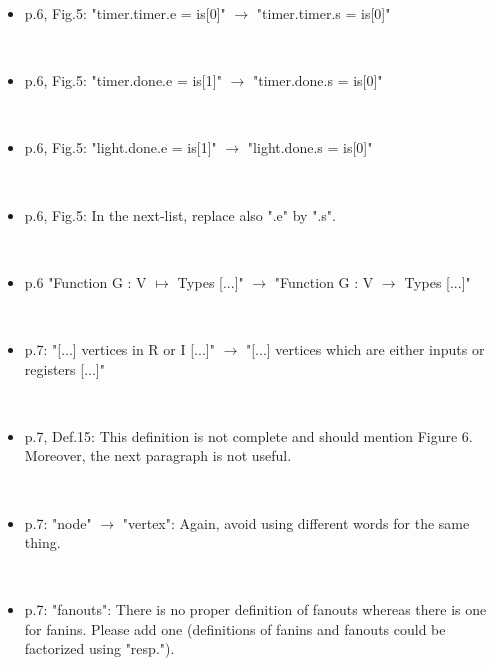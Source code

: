\begin{itemize}
~

\done

\item p.6, Fig.5: "timer.timer.e = is[0]" $\rightarrow$ "timer.timer.s = is[0]"

~

\done

\item p.6, Fig.5: "timer.done.e = is[1]" $\rightarrow$ "timer.done.s = is[0]"

~

\done

\item p.6, Fig.5: "light.done.e = is[1]" $\rightarrow$ "light.done.s = is[0]"

~

\done

\item p.6, Fig.5: In the next-list, replace also ".e" by ".s".

~

\done

\item p.6 "Function G : V $\mapsto$ Types [...]" $\rightarrow$ "Function G : V $\to$ Types 
[...]"

~

\done

\item p.7: "[...] vertices in R or I [...]" $\rightarrow$ "[...] vertices which are either 
inputs or registers [...]"

~

\done

\item p.7, Def.15: This definition is not complete and should mention Figure 6. 
Moreover, the next paragraph is not useful.

~

\done

\item p.7: "node" $\rightarrow$ "vertex": Again, avoid using different words for the same 
thing.

~

\done

\item p.7: "fanouts": There is no proper definition of fanouts whereas there is 
one for fanins. Please add one (definitions of fanins and fanouts could be 
factorized using "resp.").

~

\done
{}


\end{itemize}
